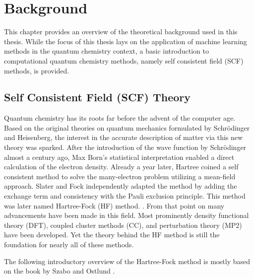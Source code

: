 \chapter{Background}
\label{sec:background}
This chapter provides an overview of the theoretical background used in this thesis. While the focus of this thesis lays on the application of machine learning methods in the quantum chemistry context, a basic introduction to computational quantum chemistry methods, namely self consistent field (SCF) methods, is provided. 

\section{Self Consistent Field (SCF) Theory}
\label{sec:background_scf}
Quantum chemistry has its roots far before the advent of the computer age. Based on the original theories on quantum mechanics formulated by Schrödinger and Heisenberg, the interest in the accurate description of matter via this new theory was sparked. After the introduction of the wave function by Schrödinger almost a century ago, Max Born's statistical interpretation enabled a direct calculation of the electron density. \parencite{ref:schroedinger_1926undulatory} Already a year later, Hartree coined a self consistent method to solve the many-electron problem utilizing a mean-field approach. Slater and Fock independently adapted the method by adding the exchange term and consistency with the Pauli exclusion principle. This method was later named Hartree-Fock (HF) method. \parencite{ref:Hartree_1928,ref:slater1930note,ref:fock1930naherungsmethode}. From that point on many advancements have been made in this field. Most prominently density functional theory (DFT), coupled cluster methods (CC), and perturbation theory (MP2) have been developed. Yet the theory behind the HF method is still the foundation for nearly all of these methods.

The following introductory overview of the Hartree-Fock method is mostly based on the book by Szabo and Ostlund \parencite{ref:szabo_ostlund}. 

